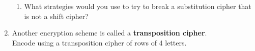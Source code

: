 \documentclass[12pt]{article}
\begin{document}
\begin{enumerate}
\begin{enumerate}
	\item What strategies would you use to try to break a substitution cipher that is not a shift cipher?
	\vfill
	\end{enumerate}
\item Another encryption scheme is called a \textbf{transposition cipher}. \\

Encode  using a transposition cipher of rows of 4 letters.\\

\vfill	
\end{enumerate}
\end{document}
